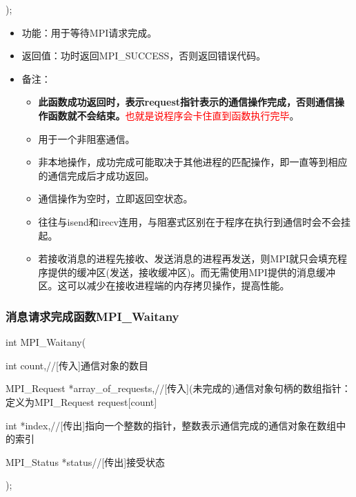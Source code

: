 \documentclass[UTF8]{article}%
\begin{document}
);

\begin{itemize}
    \item 功能：用于等待MPI请求完成。
    \item 返回值：功时返回MPI\_SUCCESS，否则返回错误代码。
    \item 备注：
    
    {
        \begin{itemize}
            \item \textbf{此函数成功返回时，表示request指针表示的通信操作完成，否则通信操作函数就不会结束。}\textcolor{red}{也就是说程序会卡住直到函数执行完毕}。
            \item 用于一个非阻塞通信。
            \item 非本地操作，成功完成可能取决于其他进程的匹配操作，即一直等到相应的通信完成后才成功返回。
            \item 通信操作为空时，立即返回空状态。
            \item 往往与isend和irecv连用，与阻塞式区别在于程序在执行到通信时会不会挂起。
            \item 若接收消息的进程先接收、发送消息的进程再发送，则MPI就只会填充程序提供的缓冲区(发送，接收缓冲区)。而无需使用MPI提供的消息缓冲区。这可以减少在接收进程端的内存拷贝操作，提高性能。
        \end{itemize}
    }

\end{itemize}

\subsubsection{消息请求完成函数MPI\_Waitany}

int MPI\_Waitany(

    \qquad int         count,//[传入]通信对象的数目

    \qquad MPI\_Request *array\_of\_requests,//[传入](未完成的)通信对象句柄的数组指针：定义为MPI\_Request request[count]

    \qquad int         *index,//[传出]指向一个整数的指针，整数表示通信完成的通信对象在数组中的索引

    \qquad MPI\_Status  *status//[传出]接受状态

);
\end{document}
